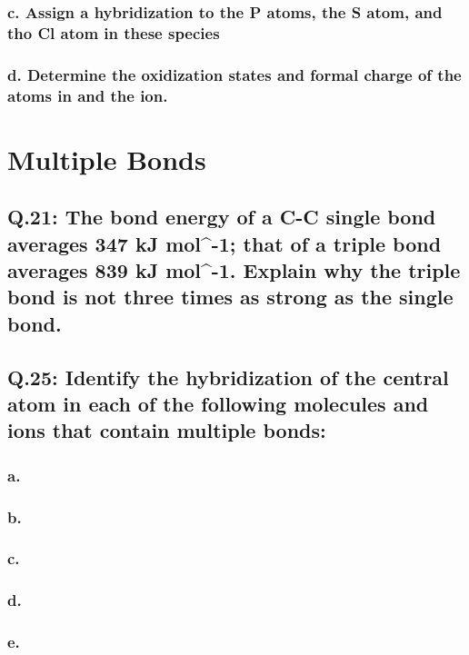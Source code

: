 \documentclass[11pt, letterpaper]{article}
\begin{document}
\subsubsection*{c. Assign a hybridization to the P atoms, the S atom, and tho Cl atom in these species}

\subsubsection*{d. Determine the oxidization states and formal charge of the atoms in 
and the  ion.}

\section{Multiple Bonds}

\subsection*{Q.21: The bond energy of a C-C  single bond averages 347 kJ mol^{-1};
that of a  triple bond averages 839 kJ mol^{-1}.
Explain why the triple bond is not three times as strong as the single bond.}


\subsection*{Q.25: Identify the hybridization of the central atom in each of the following
molecules and ions that contain multiple bonds:}

\subsubsection*{a. }

\subsubsection*{b. }

\subsubsection*{c. }

\subsubsection*{d. }

\subsubsection*{e. }
\end{document}
